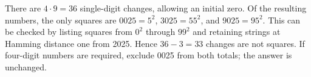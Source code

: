 There are $4\cdot9=36$ single-digit changes, allowing an initial zero. Of the resulting numbers, the only squares are $0025=5^2$, $3025=55^2$, and $9025=95^2$. This can be checked by listing squares from $0^2$ through $99^2$ and retaining strings at Hamming distance one from 2025. Hence $36-3=\boxed{33}$ changes are not squares. If four-digit numbers are required, exclude 0025 from both totals; the answer is unchanged.
